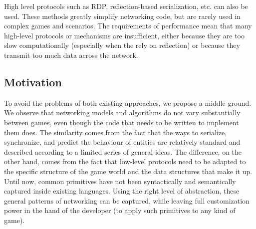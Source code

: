 High level protocols such as RDP, reflection-based serialization, etc. can also be used. These methods greatly simplify  networking code, but are rarely used in complex games and scenarios. The requirements of performance mean that many high-level protocols or mechanisms are insufficient, either because they are too slow computationally (especially when the rely on reflection) or because they transmit too much data across the network.

\subsection*{Motivation}

To avoid the problems of both existing approaches, we propose a middle ground. We observe that networking models and algorithms do not vary substantially between games, even though the code that needs to be written to implement them does. The similarity comes from the fact that the ways to serialize, synchronize, and predict the behaviour of entities are relatively standard and described according to a limited series of general ideas. The difference, on the other hand, comes from the fact that low-level protocols need to be adapted to the specific structure of the game world and the data structures that make it up. Until now, common primitives have not been syntactically and semantically captured inside existing languages. Using the right level of abstraction, these general patterns of networking can be captured, while leaving full customization power in the hand of the developer (to apply such primitives to any kind of game).

